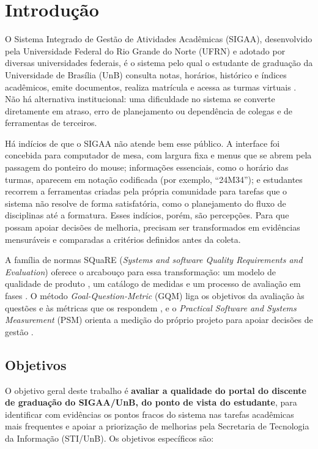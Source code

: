 \chapter{Introdução}
\label{cap:introducao}

O Sistema Integrado de Gestão de Atividades Acadêmicas (SIGAA), desenvolvido pela Universidade Federal do Rio Grande do Norte (UFRN) e adotado por diversas universidades federais, é o sistema pelo qual o estudante de graduação da Universidade de Brasília (UnB) consulta notas, horários, histórico e índices acadêmicos, emite documentos, realiza matrícula e acessa as turmas virtuais \cite{sigaa}. Não há alternativa institucional: uma dificuldade no sistema se converte diretamente em atraso, erro de planejamento ou dependência de colegas e de ferramentas de terceiros.

Há indícios de que o SIGAA não atende bem esse público. A interface foi concebida para computador de mesa, com largura fixa e menus que se abrem pela passagem do ponteiro do mouse; informações essenciais, como o horário das turmas, aparecem em notação codificada (por exemplo, ``24M34''); e estudantes recorrem a ferramentas criadas pela própria comunidade para tarefas que o sistema não resolve de forma satisfatória, como o planejamento do fluxo de disciplinas até a formatura. Esses indícios, porém, são percepções. Para que possam apoiar decisões de melhoria, precisam ser transformados em evidências mensuráveis e comparadas a critérios definidos antes da coleta.

A família de normas SQuaRE (\textit{Systems and software Quality Requirements and Evaluation}) oferece o arcabouço para essa transformação: um modelo de qualidade de produto \cite{iso25010_2023}, um catálogo de medidas \cite{iso25023} e um processo de avaliação em fases \cite{iso25040}. O método \textit{Goal-Question-Metric} (GQM) liga os objetivos da avaliação às questões e às métricas que os respondem \cite{basili1994}, e o \textit{Practical Software and Systems Measurement} (PSM) orienta a medição do próprio projeto para apoiar decisões de gestão \cite{mcgarry2002}.

\section{Objetivos}
\label{sec:objetivos}

O objetivo geral deste trabalho é \textbf{avaliar a qualidade do portal do discente de graduação do SIGAA/UnB, do ponto de vista do estudante}, para identificar com evidências os pontos fracos do sistema nas tarefas acadêmicas mais frequentes e apoiar a priorização de melhorias pela Secretaria de Tecnologia da Informação (STI/UnB). Os objetivos específicos são:

